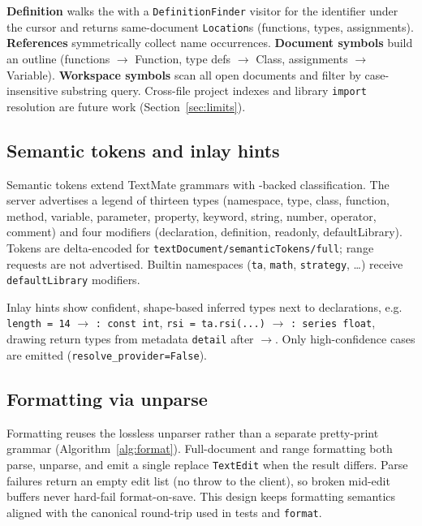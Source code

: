 \documentclass[11pt,a4paper]{article}
\begin{document}
\textbf{Definition} walks the \ast{} with a \texttt{DefinitionFinder} visitor for the
identifier under the cursor and returns same-document \texttt{Location}s (functions,
types, assignments). \textbf{References} symmetrically collect name occurrences.
\textbf{Document symbols} build an outline (functions \(\rightarrow\) Function, type
defs \(\rightarrow\) Class, assignments \(\rightarrow\) Variable). \textbf{Workspace
symbols} scan all open documents and filter by case-insensitive substring query.
Cross-file project indexes and library \texttt{import} resolution are future work
(Section~\ref{sec:limits}).

\subsection{Semantic tokens and inlay hints}
\label{sec:feat-sem}

Semantic tokens extend TextMate grammars with \ast{}-backed classification. The server
advertises a legend of thirteen types (namespace, type, class, function, method,
variable, parameter, property, keyword, string, number, operator, comment) and four
modifiers (declaration, definition, readonly, defaultLibrary). Tokens are delta-encoded
for \texttt{textDocument/semanticTokens/full}; range requests are not advertised.
Builtin namespaces (\texttt{ta}, \texttt{math}, \texttt{strategy}, \ldots) receive
\texttt{defaultLibrary} modifiers.

Inlay hints show confident, shape-based inferred types next to declarations, e.g.
\texttt{length = 14} \(\rightarrow\) \texttt{: const int}, \texttt{rsi = ta.rsi(...)}
\(\rightarrow\) \texttt{: series float}, drawing return types from metadata
\texttt{detail} after \(\rightarrow\). Only high-confidence cases are emitted
(\texttt{resolve\_provider=False}).

\subsection{Formatting via unparse}
\label{sec:feat-format}

Formatting reuses the lossless unparser rather than a separate pretty-print grammar
(Algorithm~\ref{alg:format}). Full-document and range formatting both parse, unparse,
and emit a single replace \texttt{TextEdit} when the result differs. Parse failures
return an empty edit list (no throw to the client), so broken mid-edit buffers never
hard-fail format-on-save. This design keeps formatting semantics aligned with the
canonical \ast{} round-trip used in tests and \cli{} \texttt{format}.
\end{document}
